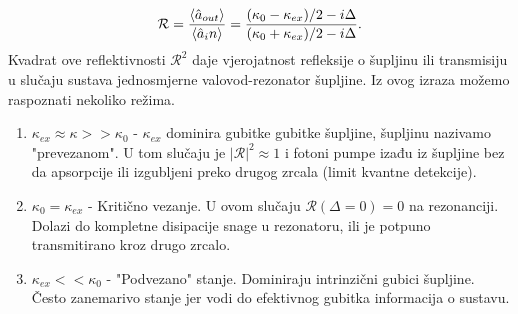 \begin{equation}
	\mathcal{R} = \frac{\braket{\hat{a}_{out}}}{\braket{\hat{a}_in}} = \frac{(\kappa_0 -\kappa_{ex})/2 -i\Delta}{(\kappa_0 +\kappa_{ex})/2 -i\Delta}.
	\label{eq:8}
\end{equation}
Kvadrat ove reflektivnosti $\mathcal{R}^2$ daje vjerojatnost refleksije o šupljinu ili transmisiju u slučaju sustava jednosmjerne valovod-rezonator šupljine.
Iz ovog izraza možemo raspoznati nekoliko režima. 
\begin{enumerate}
	\item $\kappa_{ex} \approx \kappa >>\kappa_0$ - $\kappa_{ex}$ dominira gubitke gubitke šupljine, šupljinu nazivamo "prevezanom". U tom slučaju je $|\mathcal{R}|^2 \approx 1$ 
i fotoni pumpe izađu iz šupljine bez da apsorpcije ili izgubljeni preko drugog zrcala (limit kvantne detekcije).
	\item  $\kappa_0 = \kappa_{ex}$ - Kritično vezanje. U ovom slučaju $\mathcal{R} (\Delta = 0) = 0$ na rezonanciji. Dolazi do kompletne disipacije snage u rezonatoru, ili je potpuno transmitirano kroz drugo zrcalo.
	\item $\kappa_{ex} << \kappa_0$ - "Podvezano" stanje. Dominiraju intrinzični gubici šupljine. Često zanemarivo stanje jer vodi do efektivnog gubitka informacija o sustavu.
\end{enumerate}

